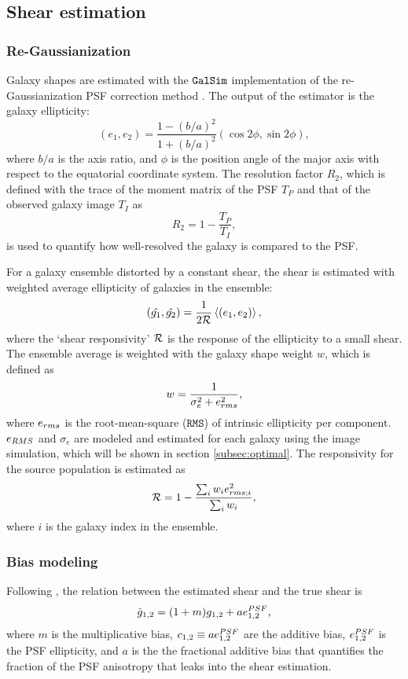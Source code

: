 \subsection{Shear estimation}
\subsubsection{Re-Gaussianization}
Galaxy shapes are estimated with the $\texttt{GalSim}$ implementation of the
re-Gaussianization PSF correction method \citep{Regaussianization}.  The
output of the estimator is the galaxy ellipticity:
\begin{equation}
    (e_1,e_2)=\frac{1-(b/a)^2}{1+(b/a)^2} (\cos 2\phi,\sin 2\phi),
\end{equation}
where $b/a$ is the axis ratio, and $\phi$ is the position angle of the major
axis with respect to the equatorial coordinate system.  The resolution factor
$R_2$, which is defined with the trace of the moment matrix of the PSF $T_P$
and that of the observed galaxy image $T_I$ as
\begin{equation}
    R_2=1-\frac{T_P}{T_I},
\end{equation}
is used to quantify how well-resolved the galaxy is compared to the PSF.

For a galaxy ensemble distorted by a constant shear, the shear is estimated
with weighted average ellipticity of galaxies in the ensemble:
\begin{equation}
    (\hat{g_1},\hat{g_2}) = \frac{1}{2\mathcal {R}}\left\langle (e_1,e_2) \right\rangle,
\end{equation}
where the `shear responsivity' $\mathcal {R}$ is the response of the ellipticity to a
small shear.
The ensemble average is weighted with the galaxy shape weight $w$, which is
defined as
\begin{equation}
    w=\frac{1}{\sigma_e^2+e_{\rm{rms}}^2},
\end{equation}
where $e_{\rm{rms}}$ is the root-mean-square ($\texttt{RMS}$) of intrinsic
ellipticity per component. $e_{\rm{RMS}}$ and $\sigma_e$ are modeled and
estimated for each galaxy using the image simulation, which will be shown in
section \ref{subsec:optimal}.
The responsivity for the source population is estimated as
\begin{equation}
    \res=1-\frac{\sum_i w_i e^2_{\rm{rms};i}}{\sum_i w_i},
\end{equation}
where $i$ is the galaxy index in the ensemble.

\subsubsection{Bias modeling}
Following \citet{HSC1-GREAT3Sim}, the relation between the estimated shear
and the true shear is
\begin{equation}
    \hat{g}_{1,2}=(1+m)g_{1,2}+a e^{\rm{PSF}}_{1,2},
\end{equation}
where $m$ is the multiplicative bias, $c_{1,2}\equiv a e^{\rm{PSF}}_{1,2}$ are
the additive bias, $e^{\rm{PSF}}_{1,2}$ is the PSF ellipticity, and $a$ is the
the fractional additive bias that quantifies the fraction of the PSF anisotropy
that leaks into the shear estimation.

